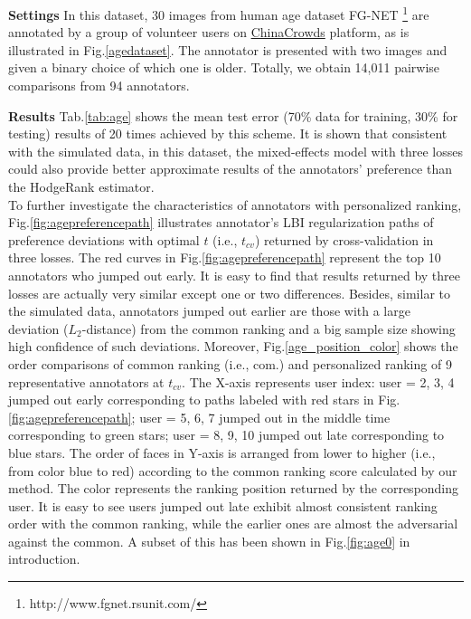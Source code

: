 \documentclass[10pt,journal,cspaper,compsoc]{IEEEtran}
\begin{document}
{{\begin{table}[h]
\begin{lrbox}{\tablebox}
\begin{tabular}{||c|c|c|c||c|c|c|c||}
\hline
\end{tabular}
\medskip
\end{lrbox}
\scalebox{1}{\usebox{\tablebox}}
\end{table}
\par}


\textbf{Settings} In this dataset, 30 images from human age dataset FG-NET \footnote{http://www.fgnet.rsunit.com/} are annotated by a group of volunteer users on \href{http://www.chinacrowds.com/}{ChinaCrowds} platform, as is illustrated in Fig.\ref{agedataset}. The annotator is presented with two images and
given a binary choice of which one is older. Totally, we obtain 14,011 pairwise comparisons from 94 annotators.

\textbf{Results} Tab.\ref{tab:age} shows the mean test error (70\% data for training, 30\% for testing)
results of 20 times achieved by this scheme. It is shown that consistent with the simulated data, in this dataset, the mixed-effects model with three losses could also provide
better approximate results of the annotators' preference than the HodgeRank estimator.\\

To further investigate the characteristics of annotators with personalized ranking, Fig.\ref{fig:agepreferencepath} illustrates annotator's LBI regularization paths of preference deviations with optimal $t$ (i.e., $t_{cv}$) returned by cross-validation in three losses. The red curves in Fig.\ref{fig:agepreferencepath} represent the top 10 annotators who jumped out early. It is easy to find that results returned by three losses are actually very similar except one or two differences. Besides, similar to the simulated data, annotators jumped out earlier are those with a large deviation ($L_2$-distance) from the common ranking and a big sample size showing high confidence of such deviations. Moreover, Fig.\ref{age_position_color} shows the order comparisons of common ranking (i.e., com.) and personalized ranking of 9 representative annotators at $t_{cv}$. The X-axis represents user index: user = 2, 3, 4 jumped out early corresponding to paths labeled with red stars in Fig.\ref{fig:agepreferencepath}; user = 5, 6, 7 jumped out in the middle time corresponding to green stars; user = 8, 9, 10 jumped out late corresponding to blue stars. The order of faces in Y-axis is arranged from lower to higher (i.e., from color blue to red) according to the common ranking score calculated by our method. The color represents the ranking position returned by the corresponding user. It is easy to see users jumped out late exhibit almost consistent ranking order with the common ranking, while the earlier ones are almost the adversarial against the common. A subset of this has been shown in Fig.\ref{fig:age0} in introduction.

}
\end{document}
